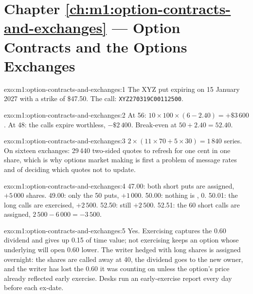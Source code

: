 \section*{Chapter \ref{ch:m1:option-contracts-and-exchanges} --- Option Contracts and the Options Exchanges}

\begin{solution}{exo:m1:option-contracts-and-exchanges:1}
The XYZ put expiring on 15 January 2027 with a strike of \$47.50. The call:
\texttt{XYZ\textvisiblespace\textvisiblespace\textvisiblespace270319C00112500}.
\end{solution}

\begin{solution}{exo:m1:option-contracts-and-exchanges:2}
At 56: $10 \times 100 \times (6 - 2.40) = +\$3\,600$. At 48: the calls expire
worthless, $-\$2\,400$. Break-even at $50 + 2.40 = 52.40$.
\end{solution}

\begin{solution}{exo:m1:option-contracts-and-exchanges:3}
$2 \times (11 \times 70 + 5 \times 30) = 1\,840$ series. On sixteen exchanges:
29\,440 two-sided quotes to refresh for one cent in one share, which is why
options market making is first a problem of message rates and of deciding
which quotes not to update.
\end{solution}

\begin{solution}{exo:m1:option-contracts-and-exchanges:4}
47.00: both short puts are assigned, $+5\,000$ shares. 49.00: only the 50
puts, $+1\,000$. 50.00: nothing is , 0. 50.01: the long calls are
exercised, $+2\,500$. 52.50: still $+2\,500$. 52.51: the 60 short calls are
assigned, $2\,500 - 6\,000 = -3\,500$.
\end{solution}

\begin{solution}{exo:m1:option-contracts-and-exchanges:5}
Yes. Exercising captures the 0.60 dividend and gives up 0.15 of time value;
not exercising keeps an option whose underlying will open 0.60 lower. The
writer hedged with long shares is assigned overnight: the shares are called
away at 40, the dividend goes to the new owner, and the writer has lost the
0.60 it was counting on unless the option's price already reflected early
exercise. Desks run an early-exercise report every day before each ex-date.
\end{solution}

